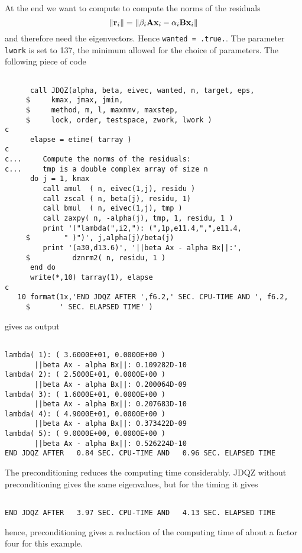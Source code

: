 \documentclass[12pt,a4paper]{article}
\def\BA{{\bf A}}\def\BB{{\bf B}}
\def\Bx{{\bf x}}\def\Br{{\bf r}}
\begin{document}
At the end we want to compute to compute the norms of the residuals
\begin{equation}
   \| \Br_i \| = \| \beta_i \BA \Bx_i - \alpha_i \BB \Bx_i \|
\end{equation}
and therefore need the eigenvectors. Hence {\tt wanted = .true.}.
The parameter {\tt lwork} is set to 137, the minimum allowed for the choice
of parameters. The following piece of code
\begin{verbatim}

      call JDQZ(alpha, beta, eivec, wanted, n, target, eps,
     $     kmax, jmax, jmin,
     $     method, m, l, maxnmv, maxstep,
     $     lock, order, testspace, zwork, lwork )
c
      elapse = etime( tarray )
c
c...     Compute the norms of the residuals:
c...     tmp is a double complex array of size n
      do j = 1, kmax
         call amul  ( n, eivec(1,j), residu )
         call zscal ( n, beta(j), residu, 1)
         call bmul  ( n, eivec(1,j), tmp )
         call zaxpy( n, -alpha(j), tmp, 1, residu, 1 )
         print '("lambda(",i2,"): (",1p,e11.4,",",e11.4,
     $        " )")', j,alpha(j)/beta(j)
         print '(a30,d13.6)', '||beta Ax - alpha Bx||:',
     $          dznrm2( n, residu, 1 )
      end do
      write(*,10) tarray(1), elapse
c
   10 format(1x,'END JDQZ AFTER ',f6.2,' SEC. CPU-TIME AND ', f6.2,
     $       ' SEC. ELAPSED TIME' )

\end{verbatim}
gives as output
\begin{verbatim}

lambda( 1): ( 3.6000E+01, 0.0000E+00 )
       ||beta Ax - alpha Bx||: 0.109282D-10
lambda( 2): ( 2.5000E+01, 0.0000E+00 )
       ||beta Ax - alpha Bx||: 0.200064D-09
lambda( 3): ( 1.6000E+01, 0.0000E+00 )
       ||beta Ax - alpha Bx||: 0.207683D-10
lambda( 4): ( 4.9000E+01, 0.0000E+00 )
       ||beta Ax - alpha Bx||: 0.373422D-09
lambda( 5): ( 9.0000E+00, 0.0000E+00 )
       ||beta Ax - alpha Bx||: 0.526224D-10
END JDQZ AFTER   0.84 SEC. CPU-TIME AND   0.96 SEC. ELAPSED TIME

\end{verbatim}
The preconditioning reduces the computing time considerably. JDQZ without
preconditioning gives the same eigenvalues, but for the timing it gives
\begin{verbatim}

END JDQZ AFTER   3.97 SEC. CPU-TIME AND   4.13 SEC. ELAPSED TIME

\end{verbatim}
hence, preconditioning gives a reduction of the computing time of about
a factor four for this example. 
\end{document}
